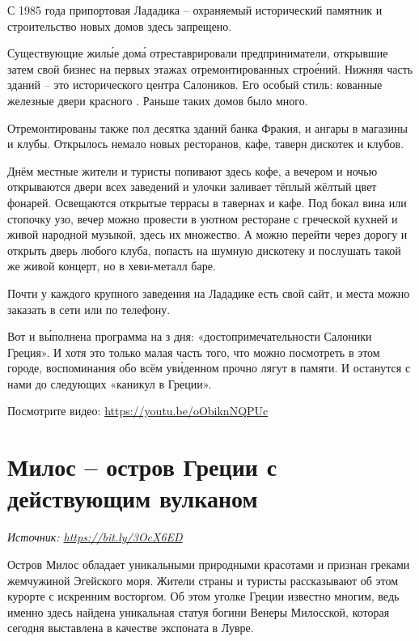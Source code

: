 С 1985 года припортовая Лададика -- охраняемый исторический памятник и строительство новых домов здесь запрещено.

Существующие жил\'{ы}е дом\'{а} отреставрировали предприниматели, открывшие затем свой бизнес на первых этажах отремонтированных стро\'{е}ний. Нижняя часть зданий -- это  исторического центра Салоников. Его особый стиль: кованные железные двери  красного . Раньше таких домов было много.

Отремонтированы также пол десятка зданий банка Фракия,  и ангары  в магазины и клубы. Открылось немало новых ресторанов, кафе, таверн дискотек и клубов.

Днём местные жители и туристы  попивают здесь кофе, а вечером и ночью открываются двери всех заведений и улочки заливает тёплый жёлтый цвет фонарей. Освещаются открытые террасы в тавернах и кафе. Под бокал вина или стопочку узо, вечер можно провести в уютном ресторане с греческой кухней и живой народной музыкой, здесь их множество. А можно перейти через дорогу и открыть дверь любого клуба, попасть на шумную дискотеку и послушать такой же живой концерт, но в хеви-металл баре.

Почти у каждого  крупного заведения на Лададике есть свой сайт, и места можно заказать  в сети или по телефону.

Вот и в\'{ы}полнена программа на з дня: «достопримечательности Салоники Греция». И хотя это только малая часть того, что можно посмотреть в этом городе, воспоминания обо всём ув\'{и}денном прочно лягут в  памяти. И останутся с нами до следующих «каникул в Греции».

Посмотрите видео: \url{https://youtu.be/oObiknNQPUc}



\newpage
\section{Милос – остров Греции с действующим вулканом}

\textit{Источник: \url{https://bit.ly/3OcX6ED}}

Остров Милос обладает уникальными природными красотами и признан греками жемчужиной Эгейского моря. Жители страны и туристы рассказывают об этом курорте с искренним восторгом. Об этом уголке Греции известно многим, ведь именно здесь найдена уникальная статуя богини Венеры Милосской, которая сегодня выставлена в качестве экспоната в Лувре.

